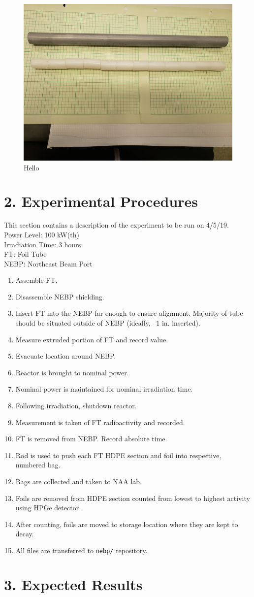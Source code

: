 \documentclass{amsart}
\theoremstyle{definition}
\begin{document}
\begin{figure}[h!]
\includegraphics[width=0.6\linewidth]{img/assy0.jpg}
\caption{Hello}
\end{figure}

\section*{2. Experimental Procedures}
\bigskip

\noindent
This section contains a description of the experiment to be run on 4/5/19. \\
Power Level: 100 kW(th) \\
Irradiation Time: 3 hours \\
FT: Foil Tube \\
NEBP: Northeast Beam Port \\


\begin{enumerate}
\item Assemble FT.
\item Disassemble NEBP shielding.
\item Insert FT into the NEBP far enough to ensure alignment. Majority of tube should be situated outside of NEBP (ideally, ~1 in. inserted).
\item Measure extruded portion of FT and record value.
\item Evacuate location around NEBP.
\item Reactor is brought to nominal power.
\item Nominal power is maintained for nominal irradiation time.
\item Following irradiation, shutdown reactor.
\item Measurement is taken of FT radioactivity and recorded.
\item FT is removed from NEBP. Record absolute time.
\item Rod is used to push each FT HDPE section and foil into respective, numbered bag.
\item Bags are collected and taken to NAA lab.
\item Foils are removed from HDPE section counted from lowest to highest activity using HPGe detector.
\item After counting, foils are moved to storage location where they are kept to decay.
\item All files are transferred to {\tt nebp/} repository.
\end{enumerate}


\section*{3. Expected Results}
\bigskip
\end{document}
